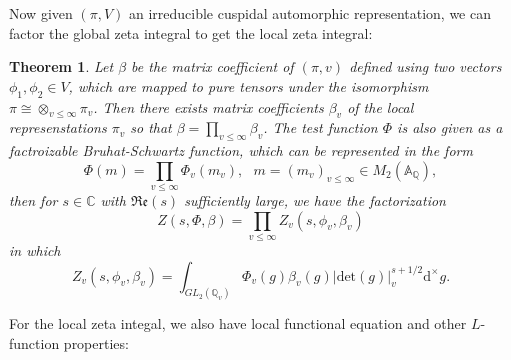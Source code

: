 \documentclass[12pt,a4paper,english]{article}
\theoremstyle{plain}
\newtheorem{thm}{Theorem}[section]
\theoremstyle{definition}
\begin{document}
 Now given $(\pi, V)$ an irreducible cuspidal automorphic representation, we can factor the global zeta integral to get the local zeta integral:
 \begin{thm}
 Let $\beta$ be the matrix coefficient of $(\pi, v)$ defined using two vectors $\phi_{1},\phi_{2}\in V$, which are mapped to pure tensors under the isomorphism $\pi\cong \otimes_{v\leq\infty}\pi_{v}$. Then there exists matrix coefficients $\beta_{v}$ of the local represenstations $\pi_{v}$ so that $\beta=\prod_{v\leq\infty}\beta_{v}$. The test function $\Phi$ is also given as a factroizable Bruhat-Schwartz function, which can be represented in the form
 \begin{equation*}
     \Phi(m)=\prod_{v\leq\infty}\Phi_{v}(m_{v}),\ \ \ m=(m_{v})_{v\leq\infty}\in M_{2}(\mathbb{A}_{\mathbb{Q}}),
 \end{equation*}
 then for $s\in \mathbb{C}$ with $\mathfrak{Re}(s)$ sufficiently large, we have the factorization 
 \begin{equation*}
     Z(s,\Phi,\beta)=\prod_{v\leq\infty}Z_{v}(s,\phi_{v},\beta_{v})
 \end{equation*}
 in which
 \begin{equation*}
     Z_{v}(s,\phi_{v},\beta_{v})=\int_{GL_{2}(\mathbb{Q}_{v})}\Phi_{v}(g)\beta_{v}(g)|\text{det}(g)|^{s+1/2}_{v}\text{d}^{\times}g.
 \end{equation*}
 \end{thm}
 For the local zeta integal, we also have local functional equation and other $L$-function properties:
\end{document}
